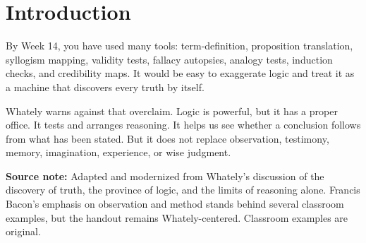 \documentclass[12pt]{article}
\newcommand{\focusbox}[1]{\par\vspace{0.4em}\noindent\begingroup\setlength{\fboxsep}{6pt}\colorbox{gray!12}{\begin{minipage}{\dimexpr\linewidth-2\fboxsep\relax}#1\end{minipage}}\endgroup\par\vspace{0.5em}}
\begin{document}
\section*{Introduction}
By Week 14, you have used many tools: term-definition, proposition translation, syllogism mapping, validity tests, fallacy autopsies, analogy tests, induction checks, and credibility maps. It would be easy to exaggerate logic and treat it as a machine that discovers every truth by itself.

Whately warns against that overclaim. Logic is powerful, but it has a proper office. It tests and arranges reasoning. It helps us see whether a conclusion follows from what has been stated. But it does not replace observation, testimony, memory, imagination, experience, or wise judgment.

\focusbox{\textbf{Source note:} Adapted and modernized from Whately's discussion of the discovery of truth, the province of logic, and the limits of reasoning alone. Francis Bacon's emphasis on observation and method stands behind several classroom examples, but the handout remains Whately-centered. Classroom examples are original.}
\end{document}

